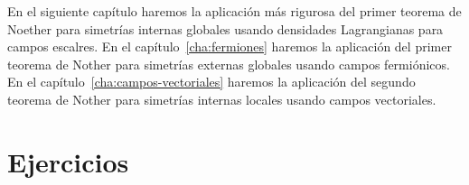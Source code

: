   

\begin{frame}
En el siguiente capítulo haremos la aplicación más rigurosa del primer teorema de Noether para simetrías internas globales usando densidades Lagrangianas para campos escalres. En el capítulo~\ref{cha:fermiones} haremos la aplicación del primer teorema de Nother para simetrías externas globales usando campos fermiónicos. En el capítulo~\ref{cha:campos-vectoriales} haremos la aplicación del segundo teorema de Nother para simetrías internas locales usando campos vectoriales.
\end{frame}


\section{Ejercicios}
\label{sec:problemas-2}
\renewcommand{\labelenumi}{\thechapter.\theenumi} %
